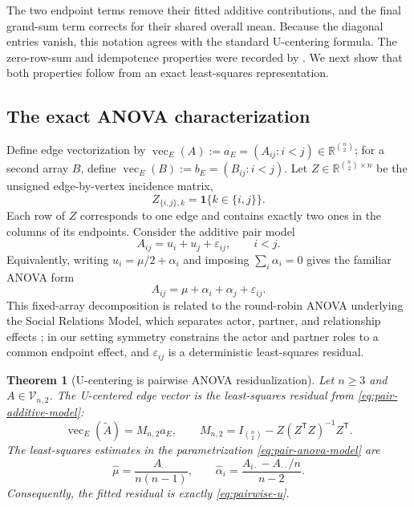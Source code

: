 \documentclass[11pt]{article}
\theoremstyle{plain}
\newtheorem{theorem}{Theorem}[section]
\theoremstyle{definition}
\theoremstyle{remark}
\newcommand{\R}{\mathbb R}
\newcommand{\cV}{\mathcal V}
\begin{document}
The two endpoint terms remove their fitted additive contributions, and the
final grand-sum term corrects for their shared overall mean.  Because the
diagonal entries vanish, this notation agrees
with the standard U-centering formula.  The zero-row-sum and idempotence
properties were recorded by \citet{SzekelyRizzo2014}.  We next show that both
properties follow from an exact least-squares representation.

\subsection{The exact ANOVA characterization}

Define edge vectorization by
$\operatorname{vec}_E(A):=a_E=(A_{ij}:i<j)\in\R^{\binom{n}{2}}$; for a second array $B$,
define $\operatorname{vec}_E(B):=b_E=(B_{ij}:i<j)$.  Let
$Z\in\R^{\binom{n}{2}\times n}$ be the unsigned
edge-by-vertex incidence matrix,
  \begin{equation*}
 Z_{\{i,j\},k}=\mathbf 1\{k\in\{i,j\}\}.
\end{equation*}
Each row of $Z$ corresponds to one edge and contains exactly two ones in the
columns of its endpoints.  Consider the additive pair model
\begin{equation}\label{eq:pair-additive-model}
  A_{ij}=u_i+u_j+\varepsilon_{ij},\qquad i<j.
\end{equation}
Equivalently, writing $u_i=\mu/2+\alpha_i$ and imposing
$\sum_i\alpha_i=0$ gives the familiar ANOVA form
\begin{equation}\label{eq:pair-anova-model}
  A_{ij}=\mu+\alpha_i+\alpha_j+\varepsilon_{ij}.
\end{equation}
This fixed-array decomposition is related to the round-robin ANOVA underlying
the Social Relations Model, which separates actor, partner, and relationship
effects \citep{WarnerKennyStoto1979,KennyLaVoie1984}; in our setting symmetry
constrains the actor and partner roles to a common endpoint effect, and
$\varepsilon_{ij}$ is a deterministic least-squares residual.

\begin{theorem}[U-centering is pairwise ANOVA residualization]
\label{thm:pair-anova}
Let $n\ge3$ and $A\in\cV_{n,2}$.  The U-centered edge vector is the
least-squares residual from \eqref{eq:pair-additive-model}:
\begin{equation}\label{eq:pair-projection}
  \operatorname{vec}_{E}(\widetilde A)
  =M_{n,2}a_E,
  \qquad
  M_{n,2}=I_{\binom{n}{2}}-Z(Z^\mathsf TZ)^{-1}Z^\mathsf T.
\end{equation}
The least-squares estimates in the parametrization
\eqref{eq:pair-anova-model} are
\begin{equation}\label{eq:pair-ls}
 \widehat\mu=\frac{A_{\cdot\cdot}}{n(n-1)},
 \qquad
 \widehat\alpha_i
 =\frac{A_{i\cdot}-A_{\cdot\cdot}/n}{n-2}.
\end{equation}
Consequently, the fitted residual is exactly \eqref{eq:pairwise-u}.
\end{theorem}
\end{document}
